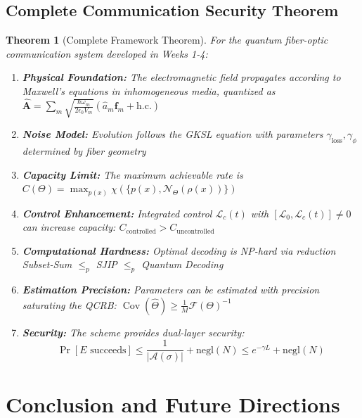 \documentclass[12pt]{article}
\newtheorem{theorem}{Theorem}[section]
\newcommand{\Cov}{\operatorname{Cov}}
\begin{document}
\subsection{Complete Communication Security Theorem}

\begin{theorem}[Complete Framework Theorem]
For the quantum fiber-optic communication system developed in Weeks 1-4:

\begin{enumerate}
    \item \textbf{Physical Foundation:} The electromagnetic field propagates according to Maxwell's equations in inhomogeneous media, quantized as \(\hat{\mathbf{A}} = \sum_m \sqrt{\frac{\hbar\omega_m}{2\epsilon_0 V_m}}(\hat{a}_m\mathbf{f}_m + \text{h.c.})\)
    
    \item \textbf{Noise Model:} Evolution follows the GKSL equation with parameters \(\gamma_{\text{loss}}, \gamma_\phi\) determined by fiber geometry
    
    \item \textbf{Capacity Limit:} The maximum achievable rate is \(C(\Theta) = \max_{p(x)} \chi(\{p(x), \mathcal{N}_\Theta(\rho(x))\})\)
    
    \item \textbf{Control Enhancement:} Integrated control \(\mathcal{L}_c(t)\) with \([\mathcal{L}_0,\mathcal{L}_c(t)] \neq 0\) can increase capacity: \(C_{\text{controlled}} > C_{\text{uncontrolled}}\)
    
    \item \textbf{Computational Hardness:} Optimal decoding is NP-hard via reduction Subset-Sum \(\leq_p\) SJIP \(\leq_p\) Quantum Decoding
    
    \item \textbf{Estimation Precision:} Parameters can be estimated with precision saturating the QCRB: \(\Cov(\hat{\Theta}) \geq \frac{1}{M}\mathcal{F}(\Theta)^{-1}\)
    
    \item \textbf{Security:} The scheme provides dual-layer security:
    \begin{equation}
        \Pr[E\text{ succeeds}] \leq \frac{1}{|\mathcal{A}(\sigma)|} + \text{negl}(N) \leq e^{-\gamma L} + \text{negl}(N)
    \end{equation}
\end{enumerate}
\end{theorem}

\section{Conclusion and Future Directions}
\end{document}
